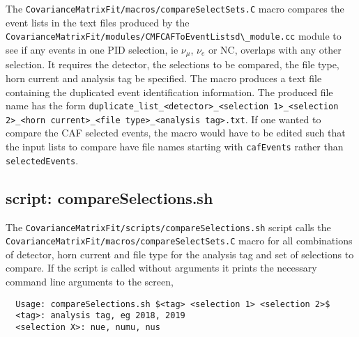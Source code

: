 The \lstinline{CovarianceMatrixFit/macros/compareSelectSets.C} macro compares the event lists in the text files produced by the \lstinline{CovarianceMatrixFit/modules/CMFCAFToEventListsd\_module.cc} module to see if any events in one PID selection, ie $\nu_{\mu}$, $\nu_{e}$ or NC, overlaps with any other selection.  It requires the detector, the selections to be compared, the file type, horn current and analysis tag be specified.  The macro produces a text file containing the duplicated event identification information.  The produced file name has the form \lstinline{duplicate_list_<detector>_<selection 1>_<selection 2>_<horn current>_<file type>_<analysis tag>.txt}.  If one wanted to compare the CAF selected events, the macro would have to be edited such that the input lists to compare have file names starting with \lstinline{cafEvents} rather than \lstinline{selectedEvents}.

\subsection{script: compareSelections.sh}

The \lstinline{CovarianceMatrixFit/scripts/compareSelections.sh} script calls the \lstinline{CovarianceMatrixFit/macros/compareSelectSets.C} macro for all combinations of detector, horn current and file type for the analysis tag and set of selections to compare. If the script is called without arguments it prints the necessary command line arguments to the screen,
\begin{lstlisting}
  Usage: compareSelections.sh $<tag> <selection 1> <selection 2>$
  <tag>: analysis tag, eg 2018, 2019
  <selection X>: nue, numu, nus
\end{lstlisting}
